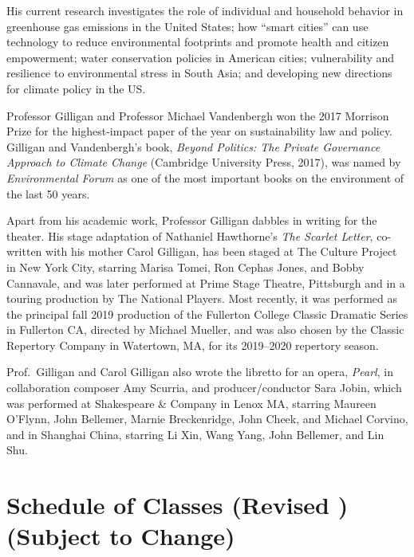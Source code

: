 \documentclass[11pt,twoside]{jgsyllabus}\usepackage[]{graphicx}\usepackage[]{color}
\begin{document}
His current research investigates the role of individual and household behavior
in greenhouse gas emissions in the United States;
how ``smart cities'' can use technology to reduce environmental footprints and
promote health and citizen empowerment;
water conservation policies in American cities;
vulnerability and resilience to environmental stress in South Asia;
and developing new directions for climate policy in the US.

Professor Gilligan and Professor Michael Vandenbergh won
the 2017 Morrison Prize for the highest-impact paper of the year
on sustainability law and policy.
Gilligan and Vandenbergh's book, %
\emph{Beyond Politics: The Private Governance Approach to Climate Change\/}
(Cambridge University Press, 2017),
was named by \emph{Environmental Forum\/} as one of the most
important books on the environment of the last 50 years.

Apart from his academic work, Professor Gilligan dabbles in writing for the
theater. His stage adaptation of Nathaniel Hawthorne's %
\emph{The Scarlet Letter},
co-written with his mother Carol Gilligan, has been staged at The Culture
Project in New York City, starring
Marisa Tomei, Ron Cephas Jones, and Bobby Cannavale, and was later performed
at Prime Stage Theatre, Pittsburgh and in a touring production by The National
Players. Most recently, it was performed as the principal fall 2019 production
of the Fullerton College Classic Dramatic Series in Fullerton CA,
directed by Michael Mueller,
and was also chosen by the Classic Repertory Company in Watertown, MA,
for its 2019--2020 repertory season.

Prof.\ Gilligan and Carol Gilligan also wrote the libretto for an opera,
\emph{Pearl}, in collaboration composer Amy Scurria, and producer/conductor
Sara Jobin, which was performed at Shakespeare \& Company in Lenox MA,
starring Maureen O'Flynn, John Bellemer, Marnie Breckenridge, John Cheek, %
and Michael Corvino, and in Shanghai China,
starring Li Xin, Wang Yang, John Bellemer, and Lin Shu.
%
%
%
%
%
%

\clearpage
\cleardoublepage
\appendix
\setcounter{secnumdepth}{0}
\newcommand{\maybehline}{\hline}%
\setlength\extrarowheight{4pt}
\section[Class Schedule]{Schedule of Classes
\ifrevised
	(Revised \RevisionDate)%
\else
	(Subject to Change)%
\fi}
\end{document}
